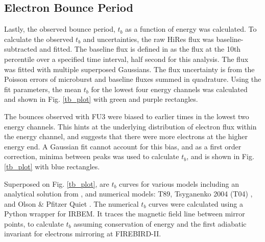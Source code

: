 \documentclass[draft,linenumbers]{agujournal}
\begin{document}
\subsection{Electron Bounce Period} \label{t_b} %
Lastly, the observed bounce period, $t_b$ as a function of energy was calculated. To calculate the observed $t_b$ and uncertainties, the raw HiRes flux was baseline-subtracted and fitted. The baseline flux is defined in \citet{O'Brien2004} as the flux at the 10th percentile over a specified time interval, half second for this analysis. The flux was fitted with multiple superposed Gaussians. The flux uncertainty is from the Poisson errors of microburst and baseline fluxes summed in quadrature. Using the fit parameters, the mean $t_b$ for the lowest four energy channels was calculated and shown in Fig. \ref{tb_plot} with green and purple rectangles. 

The bounces observed with FU3 were biased to earlier times in the lowest two energy channels. This hints at the underlying distribution of electron flux within the energy channel, and suggests that there were more electrons at the higher energy end. A Gaussian fit cannot account for this bias, and as a first order correction, minima between peaks was used to calculate $t_b$, and is shown in Fig. \ref{tb_plot} with blue rectangles.

Superposed on Fig. \ref{tb_plot}, are $t_b$ curves for various models including an analytical solution from \citet{Schulz1974}, and numerical models: T89, Tsyganenko 2004 (T04) \citep{Tsyganenko2005}, and Olson \& Pfitzer Quiet \citep{Olson1982}. The numerical $t_b$ curves were calculated using a Python wrapper for IRBEM. It traces the magnetic field line between mirror points, to calculate $t_b$ assuming conservation of energy and the first adiabatic invariant for electrons mirroring at FIREBIRD-II. 
\end{document}

